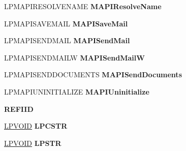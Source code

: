 \begin{DoxyCompactItemize}
\item 
\mbox{\label{struct_m_a_p_i___f_u_n_c_t_i_o_n_s_ab455b1e2fad2bad1424f9411134bf483}} 
L\+P\+M\+A\+P\+I\+R\+E\+S\+O\+L\+V\+E\+N\+A\+ME {\bfseries M\+A\+P\+I\+Resolve\+Name}
\item 
\mbox{\label{struct_m_a_p_i___f_u_n_c_t_i_o_n_s_aab3794e98fe9540e081a5e398ad1683c}} 
L\+P\+M\+A\+P\+I\+S\+A\+V\+E\+M\+A\+IL {\bfseries M\+A\+P\+I\+Save\+Mail}
\item 
\mbox{\label{struct_m_a_p_i___f_u_n_c_t_i_o_n_s_a23b9297b9d4d85f6d172a8f4c22eb7b9}} 
L\+P\+M\+A\+P\+I\+S\+E\+N\+D\+M\+A\+IL {\bfseries M\+A\+P\+I\+Send\+Mail}
\item 
\mbox{\label{struct_m_a_p_i___f_u_n_c_t_i_o_n_s_ade2c6e8ef2b29b17d5cfcede6d8ba8d2}} 
L\+P\+M\+A\+P\+I\+S\+E\+N\+D\+M\+A\+I\+LW {\bfseries M\+A\+P\+I\+Send\+MailW}
\item 
\mbox{\label{struct_m_a_p_i___f_u_n_c_t_i_o_n_s_a69c0f3827229e5cf20df0b252f0c56b4}} 
L\+P\+M\+A\+P\+I\+S\+E\+N\+D\+D\+O\+C\+U\+M\+E\+N\+TS {\bfseries M\+A\+P\+I\+Send\+Documents}
\item 
\mbox{\label{struct_m_a_p_i___f_u_n_c_t_i_o_n_s_acfef707cbd8af5ad36d9ed50ad26e688}} 
L\+P\+M\+A\+P\+I\+U\+N\+I\+N\+I\+T\+I\+A\+L\+I\+ZE {\bfseries M\+A\+P\+I\+Uninitialize}
\item 
\mbox{\label{struct_m_a_p_i___f_u_n_c_t_i_o_n_s_a9bcd8b1be7a03dbc3bd5e51bde94ffe4}} 
{\bfseries R\+E\+F\+I\+ID}
\item 
\mbox{\label{struct_m_a_p_i___f_u_n_c_t_i_o_n_s_a00fe0c80fde825c5dcf9252b5d560529}} 
\hyperlink{interfacevoid}{L\+P\+V\+O\+ID} {\bfseries L\+P\+C\+S\+TR}
\item 
\mbox{\label{struct_m_a_p_i___f_u_n_c_t_i_o_n_s_a92ce2949478d2d4d596f39662233ef17}} 
\hyperlink{interfacevoid}{L\+P\+V\+O\+ID} {\bfseries L\+P\+S\+TR}
\item 

\end{DoxyCompactItemize}
